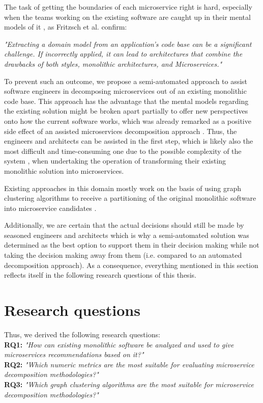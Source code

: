 \documentclass[12pt,a4paper]{report}
\begin{document}
The task of getting the boundaries of each microservice right is hard,
especially when the teams working on the existing software are caught up in
their mental models of it \cite{latoza2006maintaining}, as Fritzsch et al. confirm:
\begin{displayquote}
  \emph{
  "Extracting a domain model from an application's code base can be a significant challenge.
  If incorrectly applied, it can lead to architectures that combine the drawbacks of both styles,
  monolithic architectures, and Microservices."
  }~\cite{fritzsch2018monolith}
\end{displayquote}
To prevent such an outcome, we propose a semi-automated approach
to assist software engineers in decomposing microservices out of an existing
monolithic code base. This approach has the advantage that the mental models
regarding the existing solution might be broken apart partially to offer new
perspectives onto how the current software works, which was already remarked as
a positive side effect of an assisted microservices decomposition approach
\cite{gysel2016service}. Thus, the engineers and architects can be assisted in
the first step, which is likely also the most difficult and time-consuming one
due to the possible complexity of the system \cite{fritzsch2018monolith, france2007model},
when undertaking the operation of transforming their existing
monolithic solution into microservices.

Existing approaches in this domain mostly work on the basis of using graph
clustering algorithms to receive a partitioning of the original monolithic
software into microservice candidates \cite{fritzsch2018monolith}.

Additionally, we are certain that the actual decisions should still be made by
seasoned engineers and architects which is why a semi-automated solution was
determined as the best option to support them in their decision making while
not taking the decision making away from them (i.e. compared to an automated
decomposition approach). As a consequence, everything mentioned in this section
reflects itself in the following research questions of this thesis.



\section{Research questions}

\hangindent=1cm \noindent Thus, we derived the following research questions:\\
\textbf{RQ1:} \textit{"How can existing monolithic software be analyzed and
used to give microservices recommendations based on it?"}\\
\textbf{RQ2:} \textit{"Which numeric metrics are the most suitable for evaluating
microservice decomposition methodologies?"}\\
\textbf{RQ3:} \textit{"Which graph clustering algorithms are the most suitable
for microservice decomposition methodologies?"}
\end{document}

